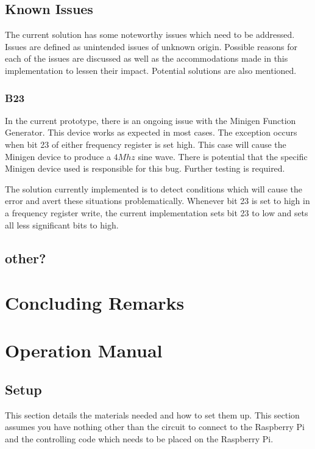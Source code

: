 \documentclass{article}	%
\begin{document}
\begin{multicols}{2}

\subsection{Known Issues}
The current solution has some noteworthy issues
which need to be addressed.
Issues are defined as unintended issues of unknown origin.
Possible reasons for each of the issues are discussed as
well as the accommodations made in this implementation to lessen their impact.
Potential solutions are also mentioned.

\subsubsection{B23}
In the current prototype,
there is an ongoing issue with the Minigen Function Generator.
This device works as expected in most cases.
The exception occurs when bit 23 of either frequency register
is set high.
This case will cause the Minigen device to produce a $4Mhz$ sine wave.
There is potential that the specific Minigen device used 
is responsible for this bug.
Further testing is required.

The solution currently implemented is
to detect conditions which will cause the error
and avert these situations problematically.
Whenever bit 23 is set to high in a frequency register write,
the current implementation sets bit 23 to low
and sets all less significant bits to high.

\subsection{other?}

\section{Concluding Remarks}

\pagebreak
\appendix

\section{Operation Manual}
\subsection{Setup}
This section details the materials needed and
how to set them up.
This section assumes you have nothing
other than the
circuit to connect to the Raspberry Pi and
the controlling code which needs to be placed on
the Raspberry Pi.


\end{multicols}
\end{document}
